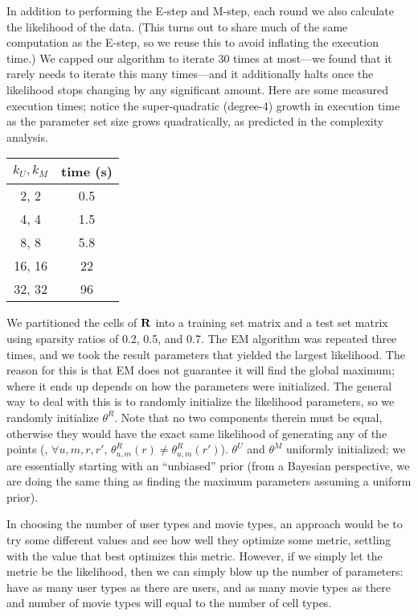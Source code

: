 \documentclass{article}
\begin{document}
In addition to performing the E-step and M-step, each round we also
calculate the likelihood of the data. (This turns out to share much of
the same computation as the E-step, so we reuse this to avoid
inflating the execution time.) We capped our algorithm to iterate 30
times at most---we found that it rarely needs to iterate this many
times---and it additionally halts once the likelihood stops changing
by any significant amount. Here are some measured execution times;
notice the super-quadratic (degree-4) growth in execution time as the
parameter set size grows quadratically, as predicted in the complexity
analysis.

\begin{center}
  \begin{tabular}{c|c}
    $k_U, k_M$ & time (s) \\ \hline
    2,  2  & 0.5 \\
    4,  4  & 1.5 \\
    8,  8  & 5.8 \\
    16, 16 & 22 \\
    32, 32 & 96
  \end{tabular}
\end{center}

We partitioned the cells of ${\bf R}$ into a training set matrix and a
test set matrix using sparsity ratios of 0.2, 0.5, and 0.7. The EM
algorithm was repeated three times, and we took the result parameters
that yielded the largest likelihood. The reason for this is that EM
does not guarantee it will find the global maximum; where it ends up
depends on how the parameters were initialized.  The general way to
deal with this is to randomly initialize the likelihood parameters, so
we randomly initialize $\theta^R$. Note that no two components therein
must be equal, otherwise they would have the exact same likelihood of
generating any of the points (\ie, $\forall u,m,r,r', \,
\theta^R_{u,m}(r) \ne \theta^R_{u,m}(r')$). $\theta^U$ and $\theta^M$
 uniformly initialized; we are essentially starting with an
``unbiased'' prior (from a Bayesian perspective, we are doing the same
thing as finding the maximum  parameters
assuming a uniform prior).

In choosing the number of user types and movie types, an approach
would be to try some different values and see how well they optimize
some metric, settling with the value that best optimizes this
metric. However, if we simply let the metric be the likelihood, then
we can simply blow up the number of parameters: have as many user
types as there are users, and as many movie types as there and number
of movie types will equal to the number of cell types.
\end{document}
